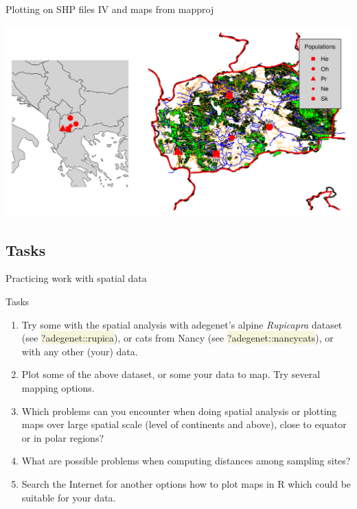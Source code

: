 \documentclass[compress, ucs, xelatex, 11pt, xcolor=svgnames, aspectratio=169,
	hyperref={
		bookmarks=true,
		unicode=true,
		colorlinks=true,
		pdftitle={Molecular data in R},
		plainpages=false,
		pdfauthor={Vojtech Zeisek},
		pdfsubject={Course about phylogeny and evolution in R},
		pdfcreator={XeLaTeX},
		pdfkeywords={R, evolution, phylogeny, molecular data},
		linkcolor=Crimson, %
		anchorcolor=Magenta, %
		citecolor=Magenta, %
		filecolor=Magenta, %
		menucolor=Magenta, %
		urlcolor=DodgerBlue, %
		pdftex},
	url={hyphens, lowtilde} %
	]{beamer}
\renewcommand{\texttt}[1]{\colorbox{Beige}{{\ttfamily #1}}}
\begin{document}
\begin{frame}{Plotting on SHP files IV and maps from mapproj}
	\begin{center}
		\includegraphics[width=\textwidth-3.5cm]{mapy.png}
	\end{center}
\end{frame}

\subsection{Tasks}

\begin{frame}{Practicing work with spatial data}
	\begin{exampleblock}{Tasks}
		\begin{enumerate}
			\item Try some with the spatial analysis with adegenet's alpine \textit{Rupicapra} dataset (see \texttt{?adegenet::rupica}), or cats from Nancy (see \texttt{?adegenet::nancycats}), or with any other (your) data.
			\item Plot some of the above dataset, or some your data to map. Try several mapping options.
			\item Which problems can you encounter when doing spatial analysis or plotting maps over large spatial scale (level of continents and above), close to equator or in polar regions?
			\item What are possible problems when computing distances among sampling sites?
			\item Search the Internet for another options how to plot maps in R which could be suitable for your data.
		\end{enumerate}
	\end{exampleblock}
\end{frame}
\end{document}
